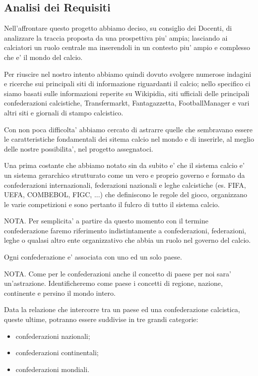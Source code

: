 \newpage
\subsection{\Large Analisi dei Requisiti}

Nell'affrontare questo progetto abbiamo deciso, su consiglio dei Docenti, di analizzare
la traccia proposta da una prospettiva piu' ampia; lasciando ai calciatori un ruolo centrale
ma inserendoli in un contesto piu' ampio e complesso che e' il mondo del calcio.

Per riuscire nel nostro intento abbiamo quindi dovuto svolgere numerose indagini e ricerche
sui principali siti di informazione riguardanti il calcio; nello specifico ci siamo basati sulle
informazioni reperite su Wikipidia, siti ufficiali delle principali confederazioni calcistiche,
Transfermarkt, Fantagazzetta, FootballManager e vari altri siti e giornali di stampo calcistico.

Con non poca difficolta' abbiamo cercato di astrarre quelle che sembravano essere le
caratteristiche fondamentali dei sitema calcio nel mondo e di inserirle, al meglio delle nostre
possibilita', nel progetto assegnatoci.

\bigskip
\bigskip

Una prima costante che abbiamo notato sin da subito e' che il sistema calcio e' un sistema
gerarchico strutturato come un vero e proprio governo e formato da confederazioni internazionali,
federazioni nazionali e leghe calcistiche (es. FIFA, UEFA, COMBEBOL, FIGC, ...) che definiscono
le regole del gioco, organizzano le varie competizioni e sono pertanto il fulcro di
tutto il sistema calcio.

NOTA. Per semplicita' a partire da questo momento con il termine confederazione faremo
riferimento indistintamente a confederazioni, federazioni, leghe o qualasi altro ente
organizzativo che abbia un ruolo nel governo del calcio.

Ogni confederazione e' associata con uno ed un solo paese.

NOTA. Come per le confederazioni anche il concetto di paese per noi sara' un'astrazione.
Identificheremo come paese i concetti di regione, nazione, continente e persino il mondo intero.

Data la relazione che intercorre tra un paese ed una confederazione calcistica, queste ultime,
potranno essere suddivise in tre grandi categorie:
\begin{itemize}
	\item confederazioni nazionali;
	\item confederazioni continentali;
	\item confederazioni mondiali.
\end{itemize}

